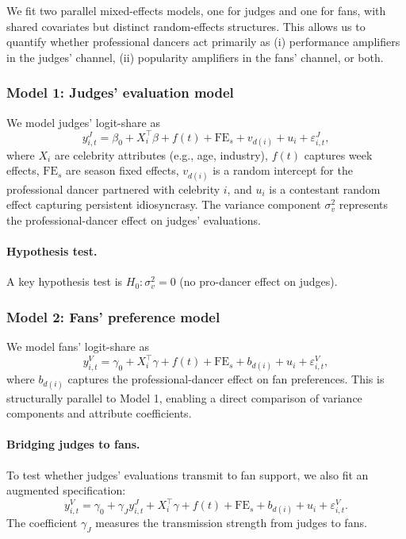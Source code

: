 We fit two parallel mixed-effects models, one for judges and one for fans, with shared covariates but distinct
random-effects structures. This allows us to quantify whether professional dancers act primarily as
(i) performance amplifiers in the judges' channel, (ii) popularity amplifiers in the fans' channel, or both.

\subsubsection{Model 1: Judges' evaluation model}
\label{subsubsec:model1_judges}

We model judges' logit-share as
\begin{equation}
y^{J}_{i,t}=\beta_0 + X_i^\top\beta + f(t) + \mathrm{FE}_s + v_{d(i)} + u_{i} + \varepsilon^{J}_{i,t},
\end{equation}
where $X_i$ are celebrity attributes (e.g., age, industry), $f(t)$ captures week effects,
$\mathrm{FE}_s$ are season fixed effects, $v_{d(i)}$ is a random intercept for the professional dancer partnered with celebrity $i$,
and $u_i$ is a contestant random effect capturing persistent idiosyncrasy.
The variance component $\sigma_v^2$ represents the professional-dancer effect on judges' evaluations.

\paragraph{Hypothesis test.}
A key hypothesis test is $H_0:\sigma_v^2=0$ (no pro-dancer effect on judges).

\subsubsection{Model 2: Fans' preference model}
\label{subsubsec:model2_fans}

We model fans' logit-share as
\begin{equation}
y^{V}_{i,t}=\gamma_0 + X_i^\top\gamma + f(t) + \mathrm{FE}_s + b_{d(i)} + u_i + \varepsilon^{V}_{i,t},
\end{equation}
where $b_{d(i)}$ captures the professional-dancer effect on fan preferences.
This is structurally parallel to Model 1, enabling a direct comparison of variance components and attribute coefficients.

\paragraph{Bridging judges to fans.}
To test whether judges' evaluations transmit to fan support, we also fit an augmented specification:
\begin{equation}
y^{V}_{i,t}=\gamma_0 + \gamma_J y^{J}_{i,t} + X_i^\top\gamma + f(t) + \mathrm{FE}_s + b_{d(i)} + u_i + \varepsilon^{V}_{i,t}.
\end{equation}
The coefficient $\gamma_J$ measures the transmission strength from judges to fans.

